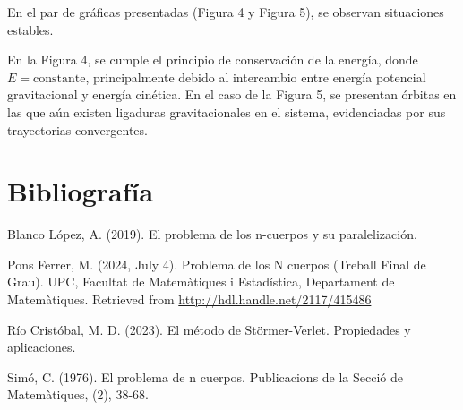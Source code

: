 En el par de gráficas presentadas (Figura 4 y Figura 5), se observan situaciones estables.

En la Figura 4, se cumple el principio de conservación de la energía, donde $E = \text{constante}$, principalmente debido al intercambio entre energía potencial gravitacional y energía cinética. En el caso de la Figura 5, se presentan órbitas en las que aún existen ligaduras gravitacionales en el sistema, evidenciadas por sus trayectorias convergentes.








\section*{Bibliografía}

Blanco López, A. (2019). El problema de los n-cuerpos y su paralelización.



Pons Ferrer, M. (2024, July 4). Problema de los N cuerpos (Treball Final de Grau). UPC, Facultat de Matemàtiques i Estadística, Departament de Matemàtiques. Retrieved from \url{http://hdl.handle.net/2117/415486}


Río Cristóbal, M. D. (2023). El método de Störmer-Verlet. Propiedades y aplicaciones.


Simó, C. (1976). El problema de n cuerpos. Publicacions de la Secció de Matemàtiques, (2), 38-68.



